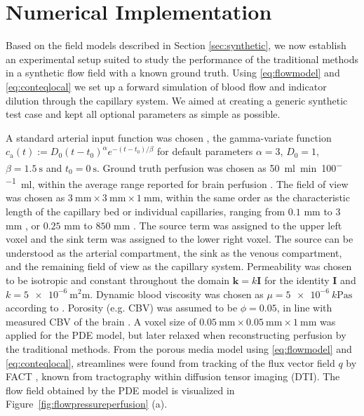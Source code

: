 \documentclass[journal,twocolumn]{IEEEtran}
\newcommand{\ca}{c_\mathrm{a}}
\newcommand{\simu}{k\pascal\second}
\newcommand{\siPml}{\milli\litre\per\minute\per100\milli\litre}
\begin{document}
	
	\section{Numerical Implementation}\label{sec:NumExp}
	Based on the field models described in Section \ref{sec:synthetic}, we now establish an experimental setup suited to study the performance of the traditional methods in a synthetic flow field with a known ground truth. 
	Using \eqref{eq:flowmodel} and \eqref{eq:conteqlocal} we set up a forward simulation of blood flow and indicator dilution through the capillary system.
	We aimed at creating a generic synthetic test case and kept all optional parameters as simple as possible. 
	
	A standard arterial input function was chosen \cite{ostergaard96}, the gamma-variate function $\ca(t) := D_0(t-t_0)^\alpha e^{-(t-t_0)/\beta}$ for default parameters $\alpha=3$, $D_0 = 1$, $\beta = \SI{1.5}{\second}$ and $t_0 = \SI{0}{\second}$.
	Ground truth perfusion was chosen as \SI{50}{\siPml}, within the average range reported for brain perfusion \cite{Obrist1984,Smith00}. The field of view was chosen as $\SI{3}{\milli\meter}\times\SI{3}{\milli\meter}\times\SI{1}{\milli\meter}$, within the same order as the characteristic length of the capillary bed or individual capillaries, ranging from $0.1$ mm to $3$ mm \cite{Cho2011}, or $0.25$ mm to $850$ mm \cite{Townsley2012}.
	The source term was assigned to the upper left voxel and the sink term was assigned to the lower right voxel. The source can be understood as the arterial compartment, the sink as the venous compartment, and the remaining field of view as the capillary system. 
	Permeability was chosen to be isotropic and constant throughout the domain $\mathbf{k}=k\mathbf{I}$ for the identity $\mathbf{I}$ and $k=\SI{5e-6}{\square\milli\meter}$.
	Dynamic blood viscosity was chosen as $\mu=\SI{5e-6}{\simu}$ according to \cite{rosencranz06}.
	Porosity (e.g. CBV) was assumed to be $\phi = 0.05$, in line with measured CBV of the brain \cite{Smith00}.
A voxel size of $\SI{0.05}{\milli\meter} \times\SI{0.05}{\milli\meter}\times\SI{1}{\milli\meter}$ was applied for the PDE model, but later relaxed when reconstructing perfusion by the traditional methods. From the porous media model using \eqref{eq:flowmodel} and \eqref{eq:conteqlocal}, streamlines were found from tracking of the flux vector field $q$ by FACT \cite{Mori1998}, known from  tractography within diffusion tensor imaging (DTI). 
	The flow field obtained by the PDE model is visualized in Figure~\ref{fig:flowpressureperfusion} (a).
	
\end{document}
